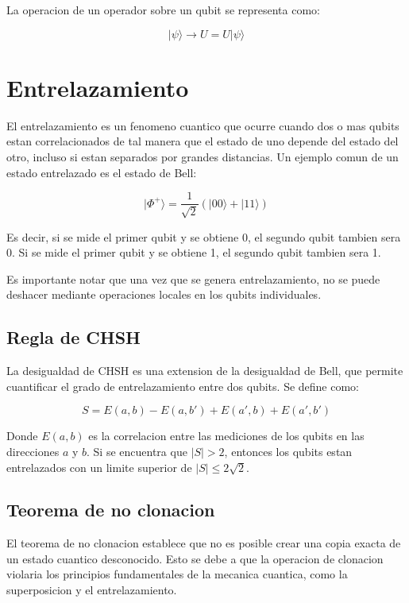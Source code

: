 \documentclass[11pt]{article}
\begin{document}
La operacion de un operador sobre un qubit se representa como:

\begin{equation}
    |\psi\rangle \rightarrow U = U |\psi\rangle
\end{equation}

\section{Entrelazamiento}

El entrelazamiento es un fenomeno cuantico que ocurre cuando dos o mas qubits estan correlacionados de tal manera que el estado de uno depende del estado del otro, incluso si estan separados por grandes distancias. Un ejemplo comun de un estado entrelazado es el estado de Bell:

\begin{equation}
    |\Phi^+\rangle = \frac{1}{\sqrt{2}} (|00\rangle + |11\rangle)
\end{equation}

Es decir, si se mide el primer qubit y se obtiene 0, el segundo qubit tambien sera 0. Si se mide el primer qubit y se obtiene 1, el segundo qubit tambien sera 1.

Es importante notar que una vez que se genera entrelazamiento, no se puede deshacer mediante operaciones locales en los qubits individuales.

\subsection{Regla de CHSH}

La desigualdad de CHSH es una extension de la desigualdad de Bell, que permite cuantificar el grado de entrelazamiento entre dos qubits. Se define como:

\begin{equation}
    S = E(a, b) - E(a, b') + E(a', b) + E(a', b')
\end{equation}

Donde $E(a, b)$ es la correlacion entre las mediciones de los qubits en las direcciones $a$ y $b$. Si se encuentra que $|S| > 2$, entonces los qubits estan entrelazados con un limite superior de $|S| \leq 2\sqrt{2}$.

\subsection{Teorema de no clonacion}

El teorema de no clonacion establece que no es posible crear una copia exacta de un estado cuantico desconocido. Esto se debe a que la operacion de clonacion violaria los principios fundamentales de la mecanica cuantica, como la superposicion y el entrelazamiento. 
\end{document}
